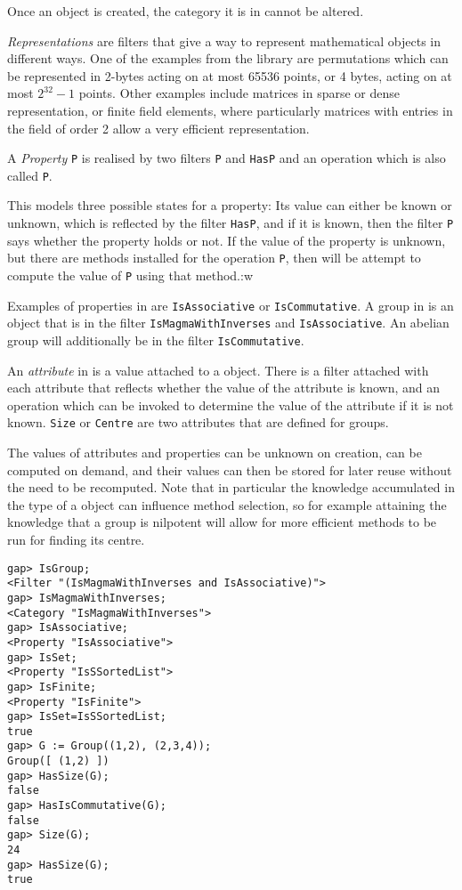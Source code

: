 Once an object is created, the category it is in cannot be altered.

\emph{Representations} are filters that give a way to represent mathematical
objects in different ways. One of the examples from the \GAP library are permutations
which can be represented in 2-bytes acting on at most 65536 points, or 4 bytes, acting
on at most $2^{32}-1$ points. Other examples include matrices in sparse or dense
representation, or finite field elements, where particularly matrices with entries in
the field of order 2 allow a very efficient representation.

A \emph{Property} \texttt{P} is realised by two filters \texttt{P} and \texttt{HasP} and an
operation which is also called \texttt{P}.

This models three possible states for a property: Its value can either be known or unknown,
which is reflected by the filter \texttt{HasP}, and if it is known, then the filter \texttt{P}
says whether the property holds or not.
If the value of the property is unknown, but there are methods installed for the operation
\texttt{P}, then \GAP will be attempt to compute the value of \texttt{P} using that method.:w

Examples of properties in \GAP are \texttt{IsAssociative}
or \texttt{IsCommutative}. A group in \GAP is an object that is in the filter
\texttt{IsMagmaWithInverses} and \texttt{IsAssociative}. An abelian group will additionally
be in the filter \texttt{IsCommutative}.

An \emph{attribute} in \GAP is a value attached to a \GAP object. There is
a filter attached with each attribute that reflects whether the value
of the attribute is known, and an operation which can be invoked to determine
the value of the attribute if it is not known.
\texttt{Size} or \texttt{Centre} are two attributes that are defined for groups.

The values of attributes and properties can be unknown on creation,
can be computed on demand, and their values can then be stored for later
reuse without the need to be recomputed. Note that in particular the knowledge
accumulated in the type of a \GAP object can influence method selection, so for
example attaining the knowledge that a group is nilpotent will allow for more
efficient methods to be run for finding its centre.

\begin{lstlisting}
gap> IsGroup;
<Filter "(IsMagmaWithInverses and IsAssociative)">
gap> IsMagmaWithInverses;
<Category "IsMagmaWithInverses">
gap> IsAssociative;
<Property "IsAssociative">
gap> IsSet;
<Property "IsSSortedList">
gap> IsFinite;
<Property "IsFinite">
gap> IsSet=IsSSortedList;
true
gap> G := Group((1,2), (2,3,4));
Group([ (1,2) ])
gap> HasSize(G);
false
gap> HasIsCommutative(G);
false
gap> Size(G);
24
gap> HasSize(G);
true
\end{lstlisting}

